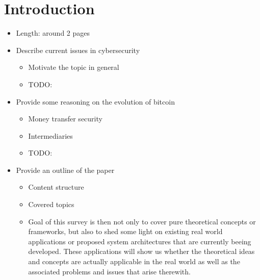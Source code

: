 \section{Introduction}

\begin{itemize}
  \item Length: around 2 pages
  \item Describe current issues in cybersecurity
  \begin{itemize}
    \item Motivate the topic in general
    \item TODO:
  \end{itemize}
  \item Provide some reasoning on the evolution of bitcoin
  \begin{itemize}
    \item Money transfer security
    \item Intermediaries
    \item TODO:
  \end{itemize}
  \item Provide an outline of the paper
  \begin{itemize}
    \item Content structure
    \item Covered topics
    \item{Goal of this survey is then not only to cover pure theoretical concepts or frameworks, but also to shed some light on existing real world applications or proposed system architectures that are currently beeing developed. These applications will show us whether the theoretical ideas and concepts are actually applicable in the real world as well as the associated problems and issues that arise therewith.} 
  \end{itemize}
\end{itemize}
